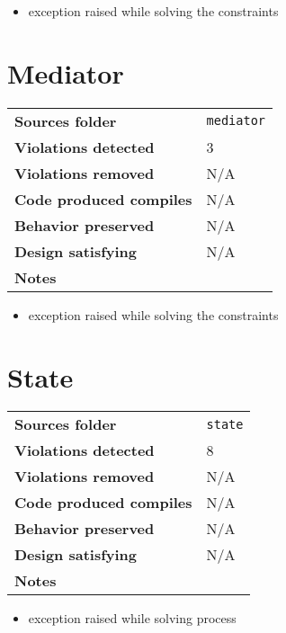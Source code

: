 \documentclass[french]{article}
\begin{document}
\begin{itemize}
\item exception raised while solving the constraints
\end{itemize}


\section*{Mediator}
\noindent\begin{tabular}{ l p{12cm} }
\textbf{Sources folder} &  \texttt{mediator}\\
\textbf{Violations detected} & 3\\
\textbf{Violations removed} & N/A\\
\textbf{Code produced compiles} & N/A\\
\textbf{Behavior preserved} & N/A \\
\textbf{Design satisfying} & N/A\\
\textbf{Notes} & \\
\end{tabular}

\begin{itemize}
\item exception raised while solving the constraints
\end{itemize}

\section*{State}
\noindent\begin{tabular}{ l p{12cm} }
\textbf{Sources folder} &  \texttt{state}\\
\textbf{Violations detected} & 8\\
\textbf{Violations removed} & N/A\\
\textbf{Code produced compiles} & N/A\\
\textbf{Behavior preserved} & N/A \\
\textbf{Design satisfying} & N/A\\
\textbf{Notes} & \\
\end{tabular}

\begin{itemize}
\item exception raised while solving process
\end{itemize}
\end{document}
